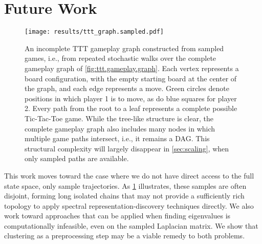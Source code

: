 \section{Future Work}

\begin{figure}
\begin{center}
\texttt{[image: results/ttt\_graph.sampled.pdf]}
\end{center}
\caption{\label{fig:ttt.sampled.graph}An incomplete TTT gameplay graph
constructed from sampled games, i.e., from repeated stochastic walks over the
complete gameplay graph of \cref{fig:ttt.gameplay.graph}. Each vertex
represents a board configuration, with the empty starting board at the center
of the graph, and each edge represents a move. Green circles denote positions
in which player 1 is to move, as do blue squares for player 2. Every path from
the root to a leaf represents a complete possible Tic-Tac-Toe game. While the
tree-like structure is clear, the complete gameplay graph also includes many
nodes in which multiple game paths intersect, i.e., it remains a DAG. This
structural complexity will largely disappear in \cref{sec:scaling}, when only
sampled paths are available.}
\end{figure}

This work moves toward the case where we do not have direct access to the full
state space, only sample trajectories. As \cref{fig:ttt.sampled.graph}
illustrates, these samples are often disjoint, forming long isolated chains
that may not provide a sufficiently rich topology to apply spectral
representation-discovery techniques directly. We also work toward approaches
that can be applied when finding eigenvalues is computationally infeasible,
even on the sampled Laplacian matrix. We show that clustering as a
preprocessing step may be a viable remedy to both problems.

